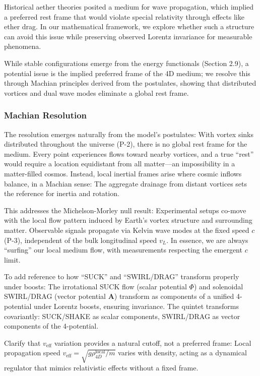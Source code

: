 Historical aether theories posited a medium for wave propagation, which implied a preferred rest frame that would violate special relativity through effects like ether drag. In our mathematical framework, we explore whether such a structure can avoid this issue while preserving observed Lorentz invariance for measurable phenomena.

While stable configurations emerge from the energy functionals (Section 2.9), a potential issue is the implied preferred frame of the 4D medium; we resolve this through Machian principles derived from the postulates, showing that distributed vortices and dual wave modes eliminate a global rest frame.

\subsubsection{Machian Resolution}

The resolution emerges naturally from the model's postulates: With vortex sinks distributed throughout the universe (P-2), there is no global rest frame for the medium. Every point experiences flows toward nearby vortices, and a true ``rest'' would require a location equidistant from all matter---an impossibility in a matter-filled cosmos. Instead, local inertial frames arise where cosmic inflows balance, in a Machian sense: The aggregate drainage from distant vortices sets the reference for inertia and rotation.

This addresses the Michelson-Morley null result: Experimental setups co-move with the local flow pattern induced by Earth's vortex structure and surrounding matter. Observable signals propagate via Kelvin wave modes at the fixed speed $c$ (P-3), independent of the bulk longitudinal speed $v_L$. In essence, we are always ``surfing'' our local medium flow, with measurements respecting the emergent $c$ limit.

To add reference to how ``SUCK'' and ``SWIRL/DRAG'' transform properly under boosts: The irrotational SUCK flow (scalar potential $\Phi$) and solenoidal SWIRL/DRAG (vector potential $\mathbf{A}$) transform as components of a unified 4-potential under Lorentz boosts, ensuring invariance. The quintet transforms covariantly: SUCK/SHAKE as scalar components, SWIRL/DRAG as vector components of the 4-potential.

Clarify that $v_{\text{eff}}$ variation provides a natural cutoff, not a preferred frame: Local propagation speed $v_{\text{eff}} = \sqrt{g \rho_{4D}^{\text{local}} / m}$ varies with density, acting as a dynamical regulator that mimics relativistic effects without a fixed frame.

